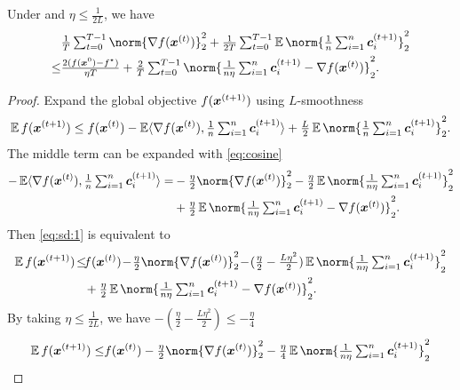 \documentclass{article}
\begin{document}
\begin{lemma}
  \label{lemma:sd}
  Under  and $\eta\le\frac{1}{2L}$, we have
  \begin{equation}\label{eq:sd:T}
    \begin{split}
      & \tfrac{1}{T}\tsum_{t=0}^{T-1} \norm{\nabla f(\xx^{(t)})}_2^2 + \tfrac{1}{2T}\tsum_{t=0}^{T-1} \E \norm{\tfrac{1}{n} \tsum_{i=1}^n \cc_i^{(t+1)} }_2^2 \\
      \le & \tfrac{2(f(\xx^{0}) - f^\star)}{\eta T}
      +\tfrac{2}{T}\tsum_{t=0}^{T-1} \norm{\tfrac{1}{n\eta} \tsum_{i=1}^n \cc_i^{(t+1)}  - \nabla f(\xx^{(t)}) }_2^2.
    \end{split}
  \end{equation}
\end{lemma}

\begin{proof}
  Expand the global objective $f(\bm{x}^{(t+1)})$ using  $L$-smoothness 
  \begin{equation} \label{eq:sd:1}
    \E f(\xx^{(t+1)}) \le f(\xx^{(t)}) - \E \langle \nabla f(\xx^{(t)}), \tfrac{1}{n} \tsum_{i=1}^n \cc_i^{(t+1)} \rangle + \tfrac{L}{2} \E \norm{\tfrac{1}{n} \tsum_{i=1}^n \cc_i^{(t+1)}}_2^2.
  \end{equation}
  The middle term can be expanded with \eqref{eq:cosine}
  \begin{align*}
    - \E \langle \nabla f(\xx^{(t)}), \tfrac{1}{n} \tsum_{i=1}^n \cc_i^{(t+1)} \rangle
    = & -\tfrac{\eta}{2} \norm{\nabla f(\xx^{(t)})}_2^2 - \tfrac{\eta}{2} \E\norm{ \tfrac{1}{n\eta} \tsum_{i=1}^n \cc_i^{(t+1)} }_2^2 \\
      & + \tfrac{\eta}{2} \E\norm{ \tfrac{1}{n\eta} \tsum_{i=1}^n \cc_i^{(t+1)}  - \nabla f(\xx^{(t)})}_2^2.
  \end{align*}
  Then \eqref{eq:sd:1} is equivalent to
  \begin{align*}
    \E f(\xx^{(t+1)})
    \!\le\! & f(\xx^{(t)}) \!-\!\tfrac{\eta}{2} \norm{\nabla f(\xx^{(t)})}_2^2 \!-\! (\tfrac{\eta}{2} - \tfrac{L\eta^2}{2})\E\norm{\tfrac{1}{n\eta} \tsum_{i=1}^n \cc_i^{(t+1)}}_2^2
    \\
            & + \tfrac{\eta}{2} \E\norm{\tfrac{1}{n\eta} \tsum_{i=1}^n \cc_i^{(t+1)} - \nabla f(\xx^{(t)})}_2^2.
  \end{align*}
  By taking $\eta\le\tfrac{1}{2L}$, we have $- (\tfrac{\eta}{2} - \tfrac{L\eta^2}{2}) \le -\frac{\eta}{4}$
  \begin{align*}
    \E f(\xx^{(t+1)}) \le & f(\xx^{(t)})  -\tfrac{\eta}{2} \norm{\nabla f(\xx^{(t)})}_2^2 - \tfrac{\eta}{4}\E\norm{\tfrac{1}{n\eta} \tsum_{i=1}^n \cc_i^{(t+1)}}_2^2 \\

\end{align*}
\end{proof}
\end{document}
